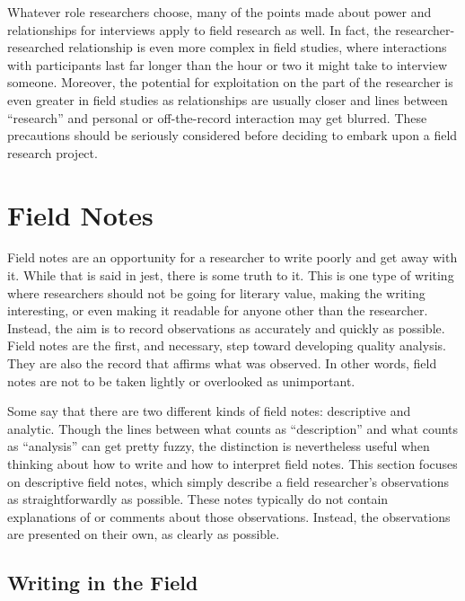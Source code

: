 Whatever role researchers choose, many of the points made about power and relationships for interviews apply to field research as well. In fact, the researcher-researched relationship is even more complex in field studies, where interactions with participants last far longer than the hour or two it might take to interview someone. Moreover, the potential for exploitation on the part of the researcher is even greater in field studies as relationships are usually closer and lines between ``research'' and personal or off-the-record interaction may get blurred. These precautions should be seriously considered before deciding to embark upon a field research project.

\section{Field Notes}

Field notes are an opportunity for a researcher to write poorly and get away with it. While that is said in jest, there is some truth to it. This is one type of writing where researchers should not be going for literary value, making the writing interesting, or even making it readable for anyone other than the researcher. Instead, the aim is to record observations as accurately and quickly as possible. Field notes are the first, and necessary, step toward developing quality analysis. They are also the record that affirms what was observed. In other words, field notes are not to be taken lightly or overlooked as unimportant.

Some say that there are two different kinds of field notes: descriptive and analytic. Though the lines between what counts as ``description'' and what counts as ``analysis'' can get pretty fuzzy, the distinction is nevertheless useful when thinking about how to write and how to interpret field notes. This section focuses on descriptive field notes, which simply describe a field researcher’s observations as straightforwardly as possible. These notes typically do not contain explanations of or comments about those observations. Instead, the observations are presented on their own, as clearly as possible.

\subsection{Writing in the Field}

